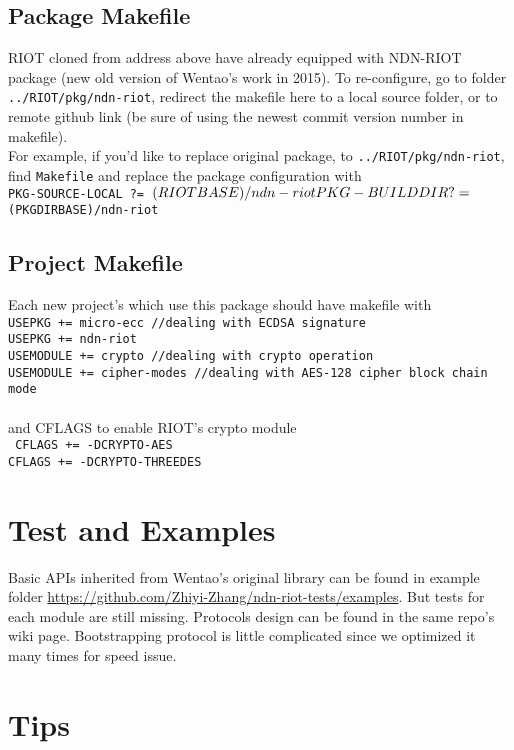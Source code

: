 \documentclass[a4paper, 11pt]{article}
\begin{document}
    \subsection*{Package Makefile}
    RIOT cloned from address above have already equipped with NDN-RIOT package (new old version of Wentao's work in 2015). To re-configure, go to folder \texttt{../RIOT/pkg/ndn-riot}, redirect the makefile here to a local source folder, or to remote github link (be sure of using the newest commit version number in makefile).\\
    For example, if you'd like to replace original package, to \texttt{../RIOT/pkg/ndn-riot}, find \texttt{Makefile} and replace the package configuration with \\
    \texttt{PKG-SOURCE-LOCAL ?= $(RIOTBASE)/ndn-riot \\
            PKG-BUILDDIR ?= $(PKGDIRBASE)/ndn-riot}
    \subsection*{Project Makefile}
    Each new project's which use this package should have makefile with \\
    \texttt{USEPKG += micro-ecc \hfill //dealing with ECDSA signature\\
            USEPKG += ndn-riot  \\
            USEMODULE += crypto \hfill //dealing with crypto operation\\
            USEMODULE += cipher-modes \hfill //dealing with AES-128 cipher block chain mode}\\ \\
    and CFLAGS to enable RIOT's crypto module \\
    \texttt{
            CFLAGS += -DCRYPTO-AES \\
            CFLAGS += -DCRYPTO-THREEDES} \\

    \section*{Test and Examples}
    Basic APIs inherited from Wentao's original library can be found in example folder \url{https://github.com/Zhiyi-Zhang/ndn-riot-tests/examples}. But tests for each module are still missing. Protocols design can be found in the same repo's wiki page. Bootstrapping protocol is little complicated since we optimized it many times for speed issue. 

    \section*{Tips}
\end{document}
